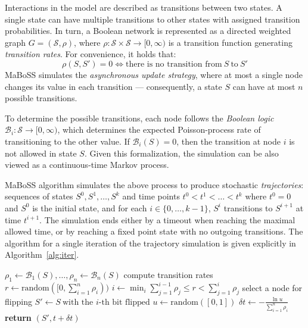 \documentclass[sn-mathphys-num]{sn-jnl}%
\begin{document}
Interactions in the model are described as transitions between two states. A single state can have multiple transitions to other states with assigned transition probabilities. In turn, a Boolean network is represented as a directed weighted graph $G = (\mathcal{S}, \rho)$, where $\rho: \mathcal{S} \times \mathcal{S} \rightarrow [0, \infty)$ is a transition function generating \emph{transition rates}. For convenience, it holds that:
\[ \rho(S, S') = 0 \iff \text{there is no transition from}\ S\ \text{to}\ S' \]
MaBoSS simulates the \emph{asynchronous update strategy}, where at most a single node changes its value in each transition --- consequently, a state $S$ can have at most $n$ possible transitions.

To determine the possible transitions, each node follows the \emph{Boolean logic} $\mathcal{B}_i: \mathcal{S} \rightarrow [0, \infty)$, which determines the expected Poisson-process rate of transitioning to the other value. If $\mathcal{B}_i(S) = 0$, then the transition at node $i$ is not allowed in state $S$.
Given this formalization, the simulation can be also viewed as a continuous-time Markov process.

MaBoSS algorithm simulates the above process to produce stochastic \emph{trajectories}: sequences of states $S^0, S^1, \dots, S^k$ and time points $t^0 < t^1 < \dots < t^k$ where $t^0 = 0$ and $S^0$ is the initial state, and for each $i \in \{0, \dots, k-1\}$, $S^i$ transitions to $S^{i+1}$ at time $t^{i+1}$. The simulation ends either by a timeout when reaching the maximal allowed time, or by reaching a fixed point state with no outgoing transitions. The algorithm for a single iteration of the trajectory simulation is given explicitly in Algorithm~\ref{alg:iter}.

\begin{algorithm}
\caption{A single iteration of the MaBoSS simulation of a trajectory, given the state $S$ and time $t$.}
\label{alg:iter}
\begin{algorithmic}[1]
\State $\rho_1 \gets \mathcal{B}_1(S), \dots, \rho_n \gets \mathcal{B}_n(S)$ \Comment compute transition rates
\State $r \gets \text{random}([0, \sum_{i=1}^n \rho_i))$
\State $i \gets \min_i \sum_{j=1}^{i-1} \rho_j \leq r < \sum_{j=1}^{i} \rho_j$ \Comment select a node for flipping
\State $S'\gets S\ \text{with the $i$-th bit flipped}$
\State $u \gets \text{random}([0, 1])$
\State $\delta t \gets -\frac{\ln u}{\sum_{i=1}^n \rho_i}$
\State \textbf{return} $(S', t + \delta t)$
\EndProcedure
\end{algorithmic}
\end{algorithm}
\end{document}
